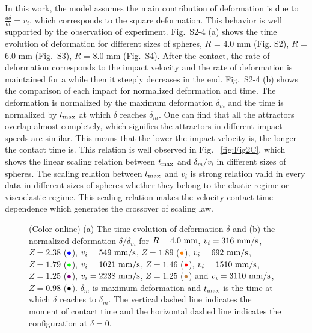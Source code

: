 \documentclass[aps,prl,superscriptaddress]{revtex4}  %
\begin{document}
In this work, the model assumes the main contribution of deformation is due to $\frac{d \delta}{dt} = v_i$, which corresponds to the square deformation. This behavior is well supported by the observation of experiment. Fig.~S2-4 (a) shows the time evolution of deformation for different sizes of spheres, $R$ = 4.0 mm (Fig. S2), $R $ = 6.0 mm (Fig.~S3), $R$ = 8.0 mm (Fig.~S4). After the contact, the rate of deformation corresponds to the impact velocity and the rate of deformation is maintained for a while then it steeply decreases in the end. Fig.~S2-4 (b) shows the comparison of each impact for normalized deformation and time. The deformation is normalized by the maximum deformation $\delta_m$ and the time is normalized by $t_{{\rm max}}$ at which $\delta$ reaches $\delta_m$. One can find that all the attractors overlap almost completely, which signifies the attractors in different impact speeds are similar. This means that the lower the impact-velocity is, the longer the contact time is. This relation is well observed in Fig. ~\ref{fig:Fig2C}, which shows the linear scaling relation between $t_{{\rm max}}$ and $\delta_m /v_i$ in different sizes of spheres. The scaling relation between $t_{\rm max}$ and $v_i$ is strong relation valid in every data in different sizes of spheres whether they belong to the elastic regime or viscoelastic regime. This scaling relation makes the velocity-contact time dependence which generates the crossover of scaling law.
%
\begin{figure}[h!]
 \caption{(Color online) (a) The time evolution of deformation $\delta$ and (b) the normalized deformation $\delta/ \delta_m$ for $R = 4.0 ~{\rm mm}$, $v_i = 316~{\rm mm/s}$, $Z = 2.38$ ($\textcolor{blue}{\bullet}$),  $v_i = 549~{\rm mm/s}$, $Z = 1.89$  ($\textcolor{orange}{\bullet}$), $v_i = 692~{\rm mm/s}$, $Z = 1.79$ ($\textcolor{green}{\bullet}$), $v_i =1021 ~{\rm mm/s}$, $Z = 1.46$ ($\textcolor{red}{\bullet}$), $v_i =1510~{\rm mm/s}$, $Z =1.25 $ ($\textcolor{violet}{\bullet}$), $v_i =2238~{\rm mm/s}$, $Z =1.25 $ ($\textcolor{brown}{\bullet}$) and $v_i = 3110~{\rm mm/s}$, $Z =0.98$ ($\textcolor{black}{\bullet}$). $\delta_m$ is maximum deformation and $t_{ {\rm max}}$ is the time at which $\delta$ reaches to $\delta_m$. The vertical dashed line indicates the moment of contact time and the horizontal dashed line indicates the configuration at $\delta = 0$. \label{fig:FS8} }
\end{figure}
\end{document}
